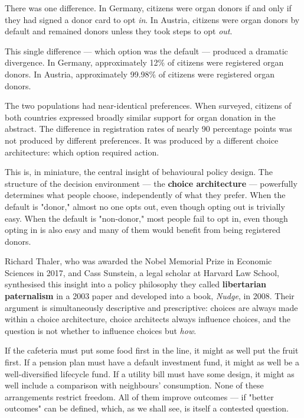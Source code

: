 \documentclass[12pt, letterpaper]{article}
\begin{document}
There was one difference. In Germany, citizens were organ donors if and only if they had signed a donor card to opt \textit{in}. In Austria, citizens were organ donors by default and remained donors unless they took steps to opt \textit{out}.

This single difference --- which option was the default --- produced a dramatic divergence. In Germany, approximately 12\% of citizens were registered organ donors. In Austria, approximately 99.98\% of citizens were registered organ donors.

The two populations had near-identical preferences. When surveyed, citizens of both countries expressed broadly similar support for organ donation in the abstract. The difference in registration rates of nearly 90 percentage points was not produced by different preferences. It was produced by a different choice architecture: which option required action.

This is, in miniature, the central insight of behavioural policy design. The structure of the decision environment --- the \textbf{choice architecture} --- powerfully determines what people choose, independently of what they prefer. When the default is "donor," almost no one opts out, even though opting out is trivially easy. When the default is "non-donor," most people fail to opt in, even though opting in is also easy and many of them would benefit from being registered donors.

Richard Thaler, who was awarded the Nobel Memorial Prize in Economic Sciences in 2017, and Cass Sunstein, a legal scholar at Harvard Law School, synthesised this insight into a policy philosophy they called \textbf{libertarian paternalism} in a 2003 paper and developed into a book, \textit{Nudge}, in 2008. Their argument is simultaneously descriptive and prescriptive: choices are always made within a choice architecture, choice architects always influence choices, and the question is not whether to influence choices but \textit{how}.

If the cafeteria must put some food first in the line, it might as well put the fruit first. If a pension plan must have a default investment fund, it might as well be a well-diversified lifecycle fund. If a utility bill must have some design, it might as well include a comparison with neighbours' consumption. None of these arrangements restrict freedom. All of them improve outcomes --- if "better outcomes" can be defined, which, as we shall see, is itself a contested question.

\medskip
\end{document}
